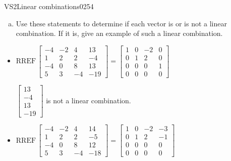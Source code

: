 \begin{exercise}{VS2}{Linear combinations}{0254}
\begin{exerciseStatement}
\begin{enumerate}[(a)]
\begin{itemize}
 
\end{itemize}

     
\item  

 Use these statements to determine if each vector is or is not a linear combination. If it is, give an example of such a linear combination. 

 
\end{enumerate}

     \end{exerciseStatement}
 \begin{exerciseAnswer} 

\begin{itemize}
\item  

 \(
\mathrm{RREF}\, \left[\begin{array}{ccc|c}
-4 & -2 & 4 & 13 \\
1 & 2 & 2 & -4 \\
-4 & 0 & 8 & 13 \\
5 & 3 & -4 & -19
\end{array}\right] = \left[\begin{array}{ccc|c}
1 & 0 & -2 & 0 \\
0 & 1 & 2 & 0 \\
0 & 0 & 0 & 1 \\
0 & 0 & 0 & 0
\end{array}\right]
                        \) 

 

 \(\left[\begin{array}{c}
13 \\
-4 \\
13 \\
-19
\end{array}\right]\) is not a linear combination. 

 
\item  

 \(
\mathrm{RREF}\, \left[\begin{array}{ccc|c}
-4 & -2 & 4 & 14 \\
1 & 2 & 2 & -5 \\
-4 & 0 & 8 & 12 \\
5 & 3 & -4 & -18
\end{array}\right] = \left[\begin{array}{ccc|c}
1 & 0 & -2 & -3 \\
0 & 1 & 2 & -1 \\
0 & 0 & 0 & 0 \\
0 & 0 & 0 & 0
\end{array}\right]
                        \) 


\end{itemize}
\end{exerciseAnswer}
\end{exercise}
